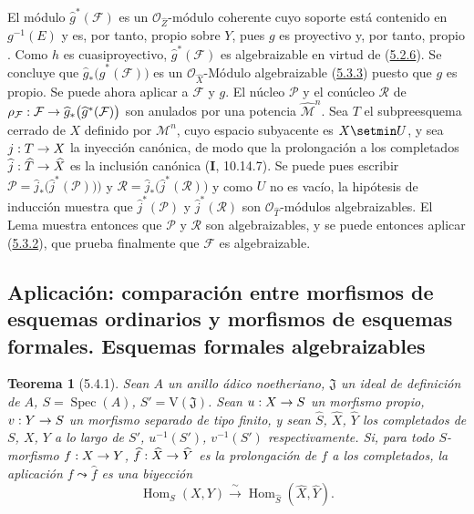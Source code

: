 \documentclass[10pt,oneside,openany]{book}
\theoremstyle{egaenv}\newtheorem*{env}{---}
\theoremstyle{egastatement}
\newtheorem*{theorem}{Teorema}
\theoremstyle{egadescription}
\newcommand{\oldpage}[2][]{\marginnote{\normalfont\scriptsize\textbf{#1}\,|\,#2}\ignorespaces}
\renewcommand{\to}{\mathchoice{\longrightarrow}{\rightarrow}{\rightarrow}{\rightarrow}}
\begin{document}
El módulo $\widehat g^{*}(\mathcal F)$ es un
$\mathcal O_{\widehat Z}$-módulo coherente cuyo soporte está contenido en
$g^{-1}(E)$ y es, por tanto, propio sobre $Y$, pues $g$ es
proyectivo y, por tanto, propio . Como $h$ es
cuasiproyectivo, $\widehat g^{*}(\mathcal F)$ es
algebraizable en virtud de (\hyperref[III.5.2.6-fr]{5.2.6}). Se concluye
\oldpage[III]{156}
que $\widehat g_*\bigl(\widehat g^{*}(\mathcal F)\bigr)$
es un $\mathcal O_{\widehat X}$-Módulo algebraizable
(\hyperref[III.5.3.3-fr]{5.3.3}) puesto que $g$ es propio. Se puede ahora
aplicar a $\mathcal F$ y $g$. El núcleo $\mathcal P$
y el conúcleo $\mathcal R$ de
$\rho_{\mathcal F}:\mathcal F\to
\widehat g_*\bigl(\widehat g^{*}(\mathcal F)\bigr)$
son anulados por una potencia $\widehat{\mathcal M}^{n}$. Sea $T$
el subpreesquema cerrado de $X$ definido por $\mathcal M^n$, cuyo
espacio subyacente es $X\setmin U$, y sea $j:T\to X$ la inyección canónica, de modo que la prolongación a los completados $\widehat j:\widehat T\to\widehat X$ es la inclusión canónica (\textbf{I}, 10.14.7). Se
puede pues escribir
$\mathcal P=\widehat j_*\bigl(\widehat j^{*}(\mathcal P)\bigr))$ y
$\mathcal R=\widehat j_*\bigl(\widehat j^{*}(\mathcal R)\bigr)$ y como $U$ no es vacío, la hipótesis de inducción muestra que
$\widehat j^{*}(\mathcal P)$ y
$\widehat j^{*}(\mathcal R)$ son $\mathcal O_{\widehat T}$-módulos
algebraizables. El Lema  muestra entonces
que $\mathcal P$ y $\mathcal R$ son algebraizables, y se puede entonces aplicar (\hyperref[III.5.3.2-fr]{5.3.2}), que prueba finalmente que $\mathcal F$ es algebraizable.



\subsection{Aplicación: comparación entre morfismos de esquemas ordinarios y morfismos de esquemas formales. Esquemas formales algebraizables}
\label{subsection:III.5.4}
\label{subsection:III.5.4-fr}

\begin{theorem}[5.4.1]
\label{III.5.4.1-fr}
Sean $A$ un anillo ádico noetheriano, $\mathfrak J$ un ideal de definición de
$A$, $S=\operatorname{Spec}(A)$, $S'=\mathrm V(\mathfrak J)$. Sean
$u:X\to S$ un morfismo propio, $v:Y\to S$ un morfismo separado de tipo finito, y
sean $\widehat S$, $\widehat X$, $\widehat Y$ los completados de $S$, $X$, $Y$ a lo
largo de $S'$, $u^{-1}(S')$, $v^{-1}(S')$ respectivamente. Si, para todo
$S$-morfismo $f:X\to Y$, $\widehat f:\widehat X\to\widehat Y$ es la
prolongación de $f$ a los completados, la aplicación $f\leadsto\widehat f$ es una
biyección
\[
\operatorname{Hom}_S(X,Y)\xrightarrow{\ \sim\ }
\operatorname{Hom}_{\widehat S}(\widehat X,\widehat Y).
\]
\end{theorem}
\end{document}
